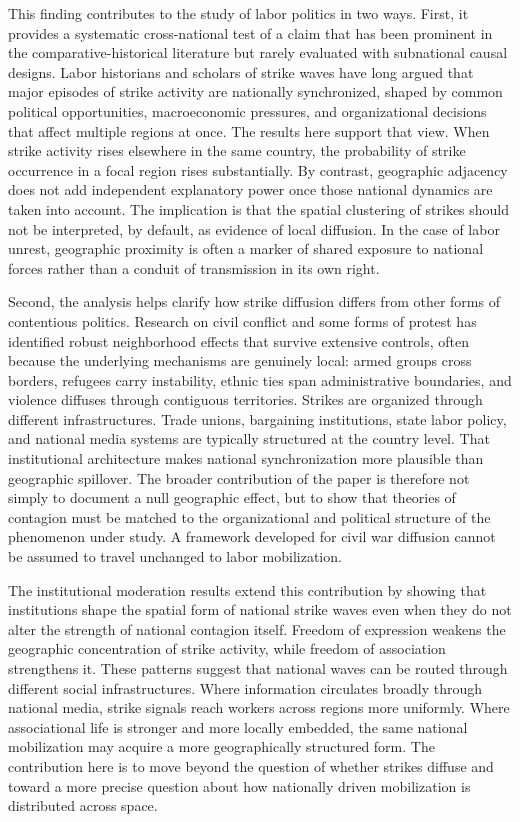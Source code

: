 \documentclass[
  11pt,
]{article}
\begin{document}
This finding contributes to the study of labor politics in two ways.
First, it provides a systematic cross-national test of a claim that has
been prominent in the comparative-historical literature but rarely
evaluated with subnational causal designs. Labor historians and scholars
of strike waves have long argued that major episodes of strike activity
are nationally synchronized, shaped by common political opportunities,
macroeconomic pressures, and organizational decisions that affect
multiple regions at once. The results here support that view. When
strike activity rises elsewhere in the same country, the probability of
strike occurrence in a focal region rises substantially. By contrast,
geographic adjacency does not add independent explanatory power once
those national dynamics are taken into account. The implication is that
the spatial clustering of strikes should not be interpreted, by default,
as evidence of local diffusion. In the case of labor unrest, geographic
proximity is often a marker of shared exposure to national forces rather
than a conduit of transmission in its own right.

Second, the analysis helps clarify how strike diffusion differs from
other forms of contentious politics. Research on civil conflict and some
forms of protest has identified robust neighborhood effects that survive
extensive controls, often because the underlying mechanisms are
genuinely local: armed groups cross borders, refugees carry instability,
ethnic ties span administrative boundaries, and violence diffuses
through contiguous territories. Strikes are organized through different
infrastructures. Trade unions, bargaining institutions, state labor
policy, and national media systems are typically structured at the
country level. That institutional architecture makes national
synchronization more plausible than geographic spillover. The broader
contribution of the paper is therefore not simply to document a null
geographic effect, but to show that theories of contagion must be
matched to the organizational and political structure of the phenomenon
under study. A framework developed for civil war diffusion cannot be
assumed to travel unchanged to labor mobilization.

The institutional moderation results extend this contribution by showing
that institutions shape the spatial form of national strike waves even
when they do not alter the strength of national contagion itself.
Freedom of expression weakens the geographic concentration of strike
activity, while freedom of association strengthens it. These patterns
suggest that national waves can be routed through different social
infrastructures. Where information circulates broadly through national
media, strike signals reach workers across regions more uniformly. Where
associational life is stronger and more locally embedded, the same
national mobilization may acquire a more geographically structured form.
The contribution here is to move beyond the question of whether strikes
diffuse and toward a more precise question about how nationally driven
mobilization is distributed across space.
\end{document}
